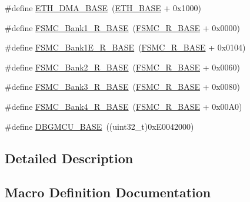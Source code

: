 \begin{DoxyCompactItemize}
\item 
\#define \mbox{\hyperlink{group___peripheral__memory__map_gace2114e1b37c1ba88d60f3e831b67e93}{E\+T\+H\+\_\+\+D\+M\+A\+\_\+\+B\+A\+SE}}~(\mbox{\hyperlink{group___peripheral__memory__map_gad965a7b1106ece575ed3da10c45c65cc}{E\+T\+H\+\_\+\+B\+A\+SE}} + 0x1000)
\item 
\#define \mbox{\hyperlink{group___peripheral__memory__map_gad196fe6f5e4041b201d14f43508c06d2}{F\+S\+M\+C\+\_\+\+Bank1\+\_\+\+R\+\_\+\+B\+A\+SE}}~(\mbox{\hyperlink{group___peripheral__memory__map_gaddf0e199dccba83272b20c9fb4d3aaed}{F\+S\+M\+C\+\_\+\+R\+\_\+\+B\+A\+SE}} + 0x0000)
\item 
\#define \mbox{\hyperlink{group___peripheral__memory__map_gaea182589c84aee30b7f735474d8774e2}{F\+S\+M\+C\+\_\+\+Bank1\+E\+\_\+\+R\+\_\+\+B\+A\+SE}}~(\mbox{\hyperlink{group___peripheral__memory__map_gaddf0e199dccba83272b20c9fb4d3aaed}{F\+S\+M\+C\+\_\+\+R\+\_\+\+B\+A\+SE}} + 0x0104)
\item 
\#define \mbox{\hyperlink{group___peripheral__memory__map_ga3cb46d62f4f6458e186a5a4c753e4918}{F\+S\+M\+C\+\_\+\+Bank2\+\_\+\+R\+\_\+\+B\+A\+SE}}~(\mbox{\hyperlink{group___peripheral__memory__map_gaddf0e199dccba83272b20c9fb4d3aaed}{F\+S\+M\+C\+\_\+\+R\+\_\+\+B\+A\+SE}} + 0x0060)
\item 
\#define \mbox{\hyperlink{group___peripheral__memory__map_gacf056152c9e5aefcc67db78d1302c0d7}{F\+S\+M\+C\+\_\+\+Bank3\+\_\+\+R\+\_\+\+B\+A\+SE}}~(\mbox{\hyperlink{group___peripheral__memory__map_gaddf0e199dccba83272b20c9fb4d3aaed}{F\+S\+M\+C\+\_\+\+R\+\_\+\+B\+A\+SE}} + 0x0080)
\item 
\#define \mbox{\hyperlink{group___peripheral__memory__map_gaf9e5417133160b0bdd0498d982acec19}{F\+S\+M\+C\+\_\+\+Bank4\+\_\+\+R\+\_\+\+B\+A\+SE}}~(\mbox{\hyperlink{group___peripheral__memory__map_gaddf0e199dccba83272b20c9fb4d3aaed}{F\+S\+M\+C\+\_\+\+R\+\_\+\+B\+A\+SE}} + 0x00\+A0)
\item 
\#define \mbox{\hyperlink{group___peripheral__memory__map_ga4adaf4fd82ccc3a538f1f27a70cdbbef}{D\+B\+G\+M\+C\+U\+\_\+\+B\+A\+SE}}~((uint32\+\_\+t)0x\+E0042000)
\end{DoxyCompactItemize}


\subsection{Detailed Description}


\subsection{Macro Definition Documentation}
\mbox{\label{group___peripheral__memory__map_ga695c9a2f892363a1c942405c8d351b91}} 
